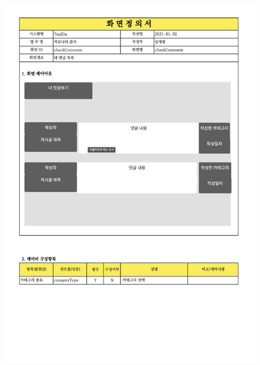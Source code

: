 {{{{{{{{{{{{{{{{{{{{{{{{{{{{{{{{{{{{{{{{{{{{{{\includegraphics[width=20cm]{./Figure/Analysis/Display/community/community_05.pdf} \\
}}}}}}}}}}}}}}}}}}}}}}}}}}}}}}}}}}}}}}}}}}}}}}
